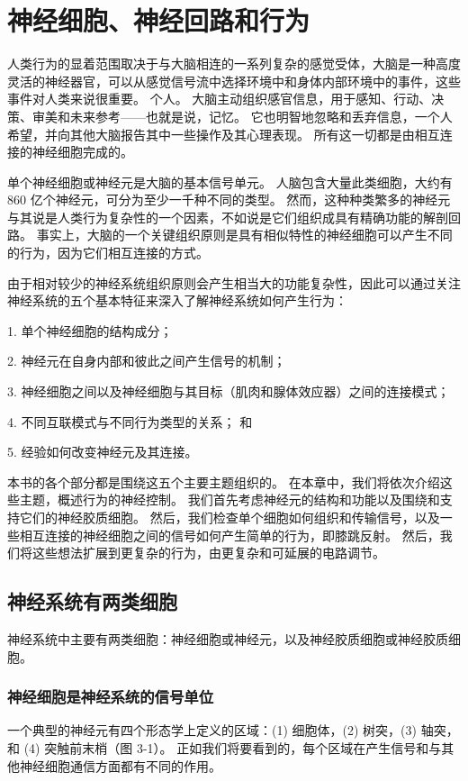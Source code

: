\chapter{神经细胞、神经回路和行为}

人类行为的显着范围取决于与大脑相连的一系列复杂的感觉受体，大脑是一种高度灵活的神经器官，可以从感觉信号流中选择环境中和身体内部环境中的事件，这些事件对人类来说很重要。 个人。 大脑主动组织感官信息，用于感知、行动、决策、审美和未来参考——也就是说，记忆。 它也明智地忽略和丢弃信息，一个人希望，并向其他大脑报告其中一些操作及其心理表现。 所有这一切都是由相互连接的神经细胞完成的。

单个神经细胞或神经元是大脑的基本信号单元。 人脑包含大量此类细胞，大约有 860 亿个神经元，可分为至少一千种不同的类型。 然而，这种种类繁多的神经元与其说是人类行为复杂性的一个因素，不如说是它们组织成具有精确功能的解剖回路。 事实上，大脑的一个关键组织原则是具有相似特性的神经细胞可以产生不同的行为，因为它们相互连接的方式。

由于相对较少的神经系统组织原则会产生相当大的功能复杂性，因此可以通过关注神经系统的五个基本特征来深入了解神经系统如何产生行为：

1. 单个神经细胞的结构成分；

2. 神经元在自身内部和彼此之间产生信号的机制；

3. 神经细胞之间以及神经细胞与其目标（肌肉和腺体效应器）之间的连接模式；

4. 不同互联模式与不同行为类型的关系； 和

5. 经验如何改变神经元及其连接。

本书的各个部分都是围绕这五个主要主题组织的。 在本章中，我们将依次介绍这些主题，概述行为的神经控制。 我们首先考虑神经元的结构和功能以及围绕和支持它们的神经胶质细胞。 然后，我们检查单个细胞如何组织和传输信号，以及一些相互连接的神经细胞之间的信号如何产生简单的行为，即膝跳反射。 然后，我们将这些想法扩展到更复杂的行为，由更复杂和可延展的电路调节。

\section{神经系统有两类细胞}

神经系统中主要有两类细胞：神经细胞或神经元，以及神经胶质细胞或神经胶质细胞。

\subsection{神经细胞是神经系统的信号单位}

一个典型的神经元有四个形态学上定义的区域：(1) 细胞体，(2) 树突，(3) 轴突，和 (4) 突触前末梢（图 3-1）。 正如我们将要看到的，每个区域在产生信号和与其他神经细胞通信方面都有不同的作用。


